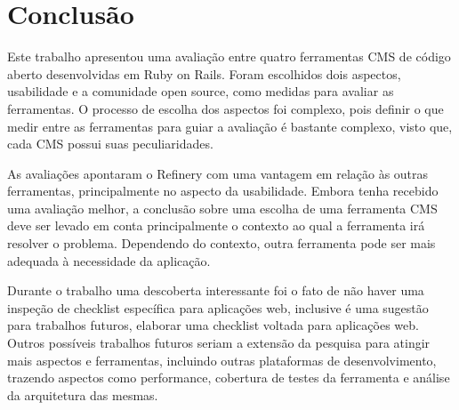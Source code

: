 \chapter{Conclusão}

Este trabalho apresentou uma avaliação entre quatro ferramentas CMS de código aberto desenvolvidas em Ruby on Rails. Foram escolhidos dois aspectos, usabilidade e a comunidade open source, como medidas para avaliar as ferramentas. O processo de escolha dos aspectos foi complexo, pois definir o que medir entre as ferramentas para guiar a avaliação é bastante complexo, visto que, cada CMS possui suas peculiaridades. 

As avaliações apontaram o Refinery com uma vantagem em relação às outras ferramentas, principalmente no aspecto da usabilidade. Embora tenha recebido uma avaliação melhor, a conclusão sobre uma escolha de uma ferramenta CMS deve ser levado em conta principalmente o contexto ao qual a ferramenta irá resolver o problema. Dependendo do contexto, outra ferramenta pode ser mais adequada à necessidade da aplicação. 

Durante o trabalho uma descoberta interessante foi o fato de não haver uma inspeção de checklist específica para aplicações web, inclusive é uma sugestão para trabalhos futuros, elaborar uma checklist voltada para aplicações web. Outros possíveis trabalhos futuros seriam a extensão da pesquisa para atingir mais aspectos e ferramentas, incluindo outras plataformas de desenvolvimento, trazendo aspectos como performance, cobertura de testes da ferramenta e análise da arquitetura das mesmas.  
